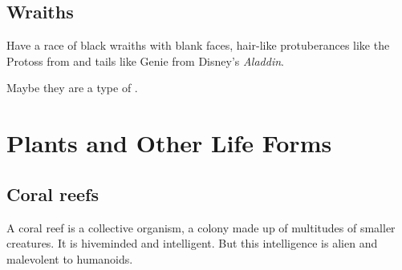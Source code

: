 \begin{comment}
\subsection{Myths}
The story of the \Reaver{} is well-known throughout \Miith{}, and myths and superstition about them about in all lands. The vast majority of the storytellers who spread such myths have never met a \Reaver{} (though they may claim otherwise), so it should come as no surprise that much of what is \quo{known} about \Reavers{} is pure superstition. 

According to the tales, \Reavers{} cannot cross running water, cast neither shadow nor reflection and cannot enter a home without invitation. Garlic or a holy symbol of Good repels them. Wolves, rats and bats serve the \Reavers{}, and they can assume the form of any of these animals. 
 
\end{comment}
















\section{Wraiths}
Have a race of black wraiths with blank faces, hair-like protuberances like the Protoss from \cite{VideoGame:Starcraft} and tails like Genie from Disney's \emph{Aladdin}. 

Maybe they are a type of \banes. 























\chapter{Plants and Other Life Forms}
\section{Coral reefs}
A coral reef is a collective organism, a colony made up of multitudes of smaller creatures. 
It is hiveminded and intelligent. 
But this intelligence is alien and malevolent to humanoids. 

